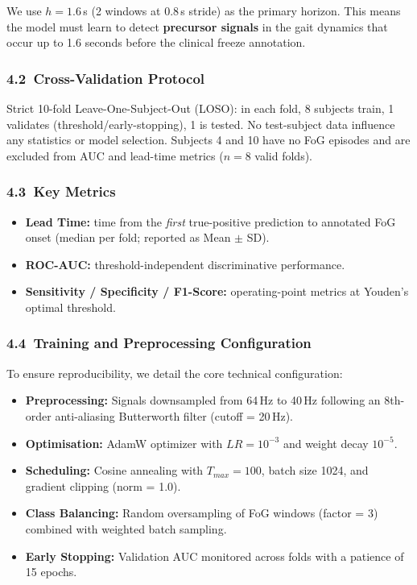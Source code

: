 \documentclass[12pt,a4paper]{article}
\begin{document}
We use $h = 1.6$\,s (2 windows at 0.8\,s stride) as the primary horizon. This means the model
must learn to detect \textbf{precursor signals} in the gait dynamics that occur up to 1.6 seconds
before the clinical freeze annotation.

\subsubsection*{4.2\ Cross-Validation Protocol}

Strict 10-fold Leave-One-Subject-Out (LOSO): in each fold, 8 subjects train, 1 validates
(threshold/early-stopping), 1 is tested. No test-subject data influence any statistics or
model selection. Subjects 4 and 10 have no FoG episodes and are excluded from AUC and lead-time
metrics ($n=8$ valid folds).

\subsubsection*{4.3\ Key Metrics}

\begin{itemize}[leftmargin=*, itemsep=3pt]
  \item \textbf{Lead Time:} time from the \emph{first} true-positive prediction to annotated FoG
        onset (median per fold; reported as Mean $\pm$ SD).
  \item \textbf{ROC-AUC:} threshold-independent discriminative performance.
  \item \textbf{Sensitivity / Specificity / F1-Score:} operating-point metrics at Youden's
        optimal threshold.
\end{itemize}

\subsubsection*{4.4\ Training and Preprocessing Configuration}

To ensure reproducibility, we detail the core technical configuration:
\begin{itemize}[leftmargin=*, itemsep=2pt]
  \item \textbf{Preprocessing:} Signals downsampled from 64\,Hz to 40\,Hz following an
        8th-order anti-aliasing Butterworth filter (cutoff = 20\,Hz).
  \item \textbf{Optimisation:} AdamW optimizer with $LR=10^{-3}$ and weight decay $10^{-5}$.
  \item \textbf{Scheduling:} Cosine annealing with $T_{max}=100$, batch size 1024, and
        gradient clipping (norm = 1.0).
  \item \textbf{Class Balancing:} Random oversampling of FoG windows (factor = 3) combined
        with weighted batch sampling.
  \item \textbf{Early Stopping:} Validation AUC monitored across folds with a patience of 15
        epochs.
\end{itemize}
\end{document}
